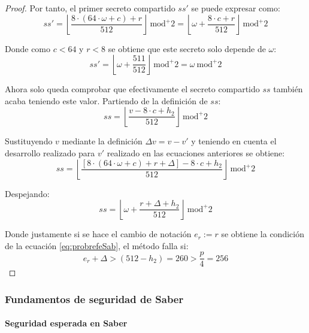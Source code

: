 \begin{proof}
	Por tanto, el primer secreto compartido \(ss'\) se puede expresar como:
	\begin{equation}
		ss'=\left\lfloor \dfrac{8\cdot (64\cdot \omega+c)+r}{512} \right\rfloor \ \text{mod}^{+}{2}=\left\lfloor \omega +\dfrac{8\cdot c+r}{512} \right\rfloor \ \text{mod}^{+}{2}
	\end{equation}
	
	Donde como \(c < 64\) y \(r < 8\) se obtiene que este secreto solo depende de $\omega$:
	\begin{equation}
		ss'=\left\lfloor \omega +\dfrac{511}{512} \right\rfloor \ \text{mod}^{+}{2}= \omega \ \text{mod}^{+}{2}
	\end{equation}
	
	Ahora solo queda comprobar que efectivamente el secreto compartido \(ss\) también acaba teniendo este valor. Partiendo de la definición de \(ss\):
	\begin{equation}
		ss=\left\lfloor \dfrac{v-8\cdot c+ h_2}{512}\right\rfloor \ \text{mod}^{+}{2}
	\end{equation}
	
	Sustituyendo \(v\) mediante la definición $\Delta v= v - v'$ y teniendo en cuenta el desarrollo realizado para \(v'\) realizado en las ecuaciones anteriores se obtiene:
	\begin{equation}
		ss=\left\lfloor \dfrac{[8\cdot(64\cdot \omega+c)+r+\Delta]-8\cdot c+ h_2}{512}\right\rfloor \ \text{mod}^{+}{2}
	\end{equation}
	
	Despejando:
	\begin{equation}
		ss=\left\lfloor \omega +\dfrac{r+\Delta+ h_2}{512}\right\rfloor \ \text{mod}^{+}{2}
	\end{equation}
	
	Donde justamente si se hace el cambio de notación \(e_r:=r\) se obtiene la condición de la ecuación \ref{eq:probrefeSab}, el método falla si:
	\begin{equation}
		e_r+\Delta > (512-h_2)= 260 >\dfrac{p}{4}=256
	\end{equation}
\end{proof}
\newpage
\subsubsection{Fundamentos de seguridad de Saber}
\paragraph{Seguridad esperada en Saber}
\mbox{}\\
